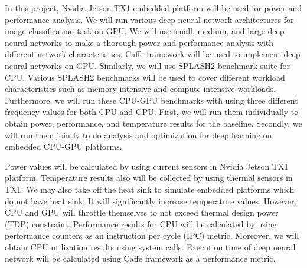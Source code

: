 In this project, Nvidia Jetson TX1 embedded platform will be used for power and performance analysis. We will run various deep neural network architectures for image classification task on GPU. We will use small, medium, and large deep neural networks to make a thorough power and performance analysis with different network characteristics. Caffe framework \cite{caffe} will be used to implement deep neural networks on GPU. Similarly, we will use SPLASH2 benchmark suite for CPU. Various SPLASH2 benchmarks will be used to cover different workload characteristics such as memory-intensive and compute-intensive workloads. Furthermore, we will run these CPU-GPU benchmarks with using three different frequency values for both CPU and GPU. First, we will run them individually to obtain power, performance, and temperature results for the baseline. Secondly, we will run them jointly to do analysis and optimization for deep learning on embedded CPU-GPU platforms.

Power values will be calculated by using current sensors in Nvidia Jetson TX1 platform. Temperature results also will be collected by using thermal sensors in TX1. We may also take off the heat sink to simulate embedded platforms which do not have heat sink. It will significantly increase temperature values. However, CPU and GPU will throttle themselves to not exceed thermal design power (TDP) constraint. Performance results for CPU will be calculated by using performance counters as an instruction per cycle (IPC) metric. Moreover, we will obtain CPU utilization results using system calls. Execution time of deep neural network will be calculated using Caffe framework as a performance metric. 

